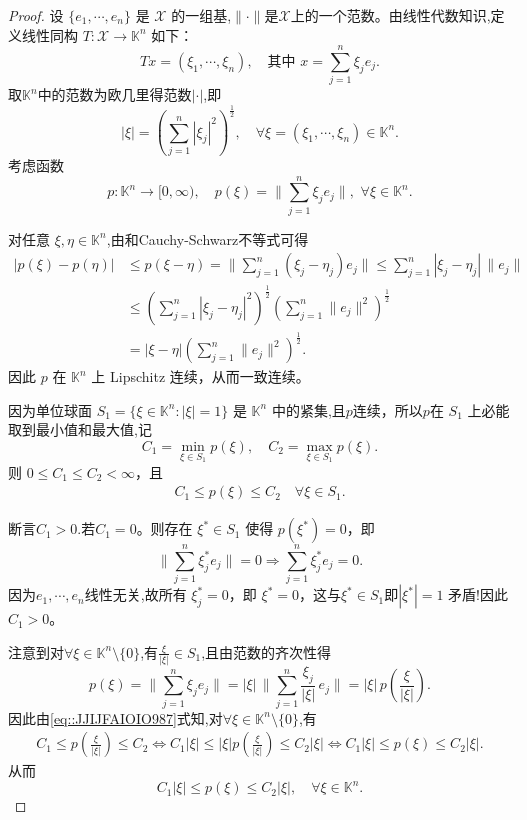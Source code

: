 \documentclass[../../main.tex]{subfiles}%
\begin{document}
\begin{proof}

设 $\{e_1,\cdots,e_n\}$ 是 $\mathscr{X}$ 的一组基,$\|\cdot \|$是$\mathscr{X}$上的一个范数。由线性代数知识,定义线性同构 $T:\mathscr{X}\to\mathbb{K}^n$ 如下：
\[
T x = (\xi_1,\cdots,\xi_n),\quad \text{其中 } x = \sum_{j=1}^n \xi_j e_j.
\]
取$\mathbb{K}^n$中的范数为欧几里得范数$|\cdot|$,即
\[
|\xi| = \left(\sum_{j=1}^n |\xi_j|^2\right)^{\frac{1}{2}},\quad \forall \xi = (\xi_1,\cdots,\xi_n)\in\mathbb{K}^n.
\]
考虑函数
\[
p:\mathbb{K}^n\to[0,\infty),\quad p(\xi) = \biggl\|\sum_{j=1}^n \xi_j e_j\biggr\|,\,\,\forall \xi\in\mathbb{K}^n.
\]

对任意 $\xi,\eta\in\mathbb{K}^n$,由和Cauchy-Schwarz不等式可得
\begin{align*}
|p(\xi)-p(\eta)|
&\leqslant p(\xi-\eta) = \biggl\|\sum_{j=1}^n (\xi_j-\eta_j)e_j\biggr\|
\leqslant \sum_{j=1}^n |\xi_j-\eta_j| \,\|e_j\| \\
&\leqslant \left(\sum_{j=1}^n |\xi_j-\eta_j|^2\right)^{\frac{1}{2}}
\left(\sum_{j=1}^n \|e_j\|^2\right)^{\frac{1}{2}} \\
&= |\xi-\eta| \left(\sum_{j=1}^n \|e_j\|^2\right)^{\frac{1}{2}}.
\end{align*}
因此 $p$ 在 $\mathbb{K}^n$ 上 Lipschitz 连续，从而一致连续。

因为单位球面 $S_1 = \{\xi\in\mathbb{K}^n : |\xi|=1\}$ 是 $\mathbb{K}^n$ 中的紧集,且$p$连续，所以$p$在 $S_1$ 上必能取到最小值和最大值,记
\[
C_1 = \min_{\xi\in S_1} p(\xi),\quad C_2 = \max_{\xi\in S_1} p(\xi).
\]
则 $0\leqslant C_1\leqslant C_2 <\infty$，且
\begin{align}
C_1 \leqslant p(\xi) \leqslant C_2 \quad \forall \xi\in S_1.\label{eq::JJIJFAIOIO987}
\end{align}

断言$C_1>0$.若$C_1=0$。则存在 $\xi^*\in S_1$ 使得 $p(\xi^*)=0$，即
\[
\biggl\|\sum_{j=1}^n \xi_j^* e_j\biggr\| =0 \Longrightarrow\sum_{j=1}^n \xi_j^* e_j = 0.
\]
因为$e_1,\cdots,e_n$线性无关,故所有 $\xi_j^*=0$，即 $\xi^*=0$，这与$\xi^*\in S_1$即$|\xi^*|=1$ 矛盾!因此 $C_1>0$。

注意到对$\forall \xi\in\mathbb{K}^n\setminus\{0\}$,有$\frac{\xi}{|\xi|}\in S_1$,且由范数的齐次性得
\[
p(\xi)=\biggl\|\sum_{j=1}^n \xi_j e_j\biggr\|
=|\xi|\,\biggl\|\sum_{j=1}^n \frac{\xi_j}{|\xi|}\,e_j\biggr\|
=|\xi|\,p\!\left(\frac{\xi}{|\xi|}\right).
\]
因此由\eqref{eq::JJIJFAIOIO987}式知,对$\forall \xi \in\mathbb{K}^n\setminus \{0\}$,有
\begin{align*}
C_1\leqslant p\left( \frac{\xi}{\left| \xi \right|} \right) \leqslant C_2\Longleftrightarrow C_1\left| \xi \right|\leqslant \left| \xi \right|p\left( \frac{\xi}{\left| \xi \right|} \right) \leqslant C_2\left| \xi \right|\Longleftrightarrow C_1|\xi |\leqslant p\left( \xi \right) \leqslant C_2|\xi |.
\end{align*}
从而
\[
C_1 |\xi| \leqslant p(\xi) \leqslant C_2 |\xi|,\quad \forall \xi\in\mathbb{K}^n.
\]


\end{proof}
\end{document}
